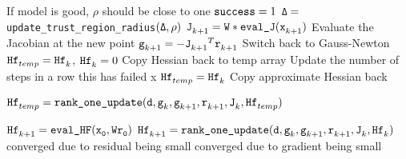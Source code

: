 \begin{algorithm}
\begin{algorithmic}[1]
        \Comment If model is good, $\rho$ should be close to one
          \State ${\tt success} = 1$
        \EndIf
        \State ${\tt \Delta = }${\tt update\_trust\_region\_radius}${\tt (\Delta,\rho)}$
      \EndWhile
      \State $\iter[k+1]{\tJ} = {\tt W * \text{\tt eval\_J}}(\iter[k+1]{\tx})$
      \Comment Evaluate the Jacobian at the new point
      \State $\iter[k+1]{\tg} = -{\iter[k+1]{\tJ}}^T\iter[k+1]{\tr}$
          \If { $\|\iter[k+1]{\tg}\| > \|\iter[k]{\tg} \| $}
          \Comment Switch back to Gauss-Newton
          \State ${\iter[temp]{\thess}} = \iter[k]{\thess}$, $\iter[k]{\thess} = 0$
          \Comment Copy Hessian back to temp array
          \EndIf
        \Else
          \Comment Update the number of steps in a row this has failed
            x
            \State ${\iter[temp]{\thess}} = {\iter[k]{\thess}}$
            \Comment Copy approximate Hessian back
          \EndIf
          \EndIf
        \EndIf
  \end{algorithmic}
  
\end{algorithm}

\begin{algorithm}
  \ContinuedFloat
  \begin{algorithmic}
      \State ${\iter[temp]{\thess}} = \Call{{\tt rank\_one\_update}}{\td ,\iter[k]{\tg},\iter[k+1]{\tg}, \iter[k+1]{\tr},\iter[k]{\tJ},\iter[temp]{\thess}}$
      \EndIf
    \EndIf

        \State $\iter[k+1]{\thess} = {\tt \text{\tt eval\_HF}(\iter[0]{\tx},W\iter[0]{\tr})}$
      \Else
        \State ${\iter[k+1]{\thess}} = \Call{{\tt rank\_one\_update}}{\td ,\iter[k]{\tg},\iter[k+1]{\tg}, \iter[k+1]{\tr},\iter[k]{\tJ},\iter[k]{\thess}}$
      \EndIf
    \EndIf
    \Comment converged due to residual being small
    \Comment converged due to gradient being small
    \EndIf
    \EndFor
  \end{algorithmic}
\end{algorithm}


